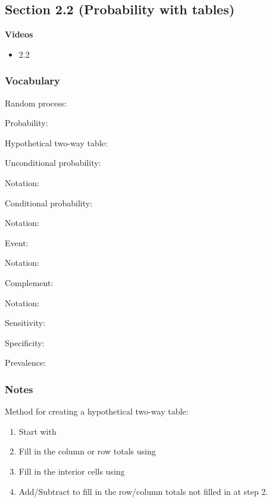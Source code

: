 \documentclass[
]{report}
\providecommand{\tightlist}{%
  \setlength{\itemsep}{0pt}\setlength{\parskip}{0pt}}
\newcommand{\rgs}{\vspace{12pt}} %
\newcommand{\rgi}{\hspace{24pt}}  %
\begin{document}
\hypertarget{section-2.2-probability-with-tables}{%
\subsection*{Section 2.2 (Probability with tables)}\label{section-2.2-probability-with-tables}}


\textbf{Videos}

\begin{itemize}
\tightlist
\item
  2.2
\end{itemize}


\hypertarget{vocabulary-4}{%
\subsubsection*{Vocabulary}\label{vocabulary-4}}

Random process:
\rgs

Probability:
\rgs

Hypothetical two-way table:
\rgs

Unconditional probability:
\rgs

\rgi Notation:
\rgs

Conditional probability:
\rgs

\rgi Notation:
\rgs

Event:
\rgs

\rgi Notation:
\rgs

Complement:
\rgs

\rgi Notation:
\rgs

Sensitivity:
\rgs

Specificity:
\rgs

Prevalence:
\rgs

\hypertarget{notes-5}{%
\subsubsection*{Notes}\label{notes-5}}

Method for creating a hypothetical two-way table:

\begin{enumerate}
\def\labelenumi{\arabic{enumi}.}
\item
  Start with
  \rgs
\item
  Fill in the column or row totals using
  \rgs
\item
  Fill in the interior cells using
  \rgs
\item
  Add/Subtract to fill in the row/column totals not filled in at step 2.
\end{enumerate}
\end{document}
